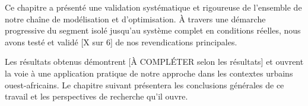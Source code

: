 Ce chapitre a présenté une validation systématique et rigoureuse de l'ensemble de notre chaîne de modélisation et d'optimisation. À travers une démarche progressive du segment isolé jusqu'au système complet en conditions réelles, nous avons testé et validé [X sur 6] de nos revendications principales.


Les résultats obtenus démontrent [À COMPLÉTER selon les résultats] et ouvrent la voie à une application pratique de notre approche dans les contextes urbains ouest-africains. Le chapitre suivant présentera les conclusions générales de ce travail et les perspectives de recherche qu'il ouvre.
